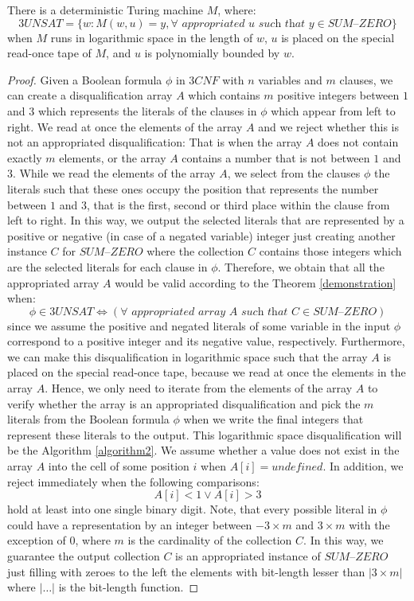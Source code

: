 \documentclass[a4paper,UKenglish,cleveref, autoref]{lipics-v2019}
\begin{document}
\begin{theorem}
\label{demonstration}
There is a deterministic Turing machine $M$, where:
\[3UNSAT = \{w: M(w, u) = y, \forall \textit{ appropriated } u \textit{ such that } y \in \textit{SUM--ZERO}\}\]
when $M$ runs in logarithmic space in the length of $w$, $u$ is placed on the special read-once tape of $M$, and $u$ is polynomially bounded by $w$.
\end{theorem}

\begin{proof}
Given a Boolean formula $\phi$ in $3CNF$ with $n$ variables and $m$ clauses, we can create a disqualification array $A$ which contains $m$ positive integers between $1$ and $3$ which represents the literals of the clauses in $\phi$ which appear from left to right. We read at once the elements of the array $A$ and we reject whether this is not an appropriated disqualification: That is when the array $A$ does not contain exactly $m$ elements, or the array $A$ contains a number that is not between $1$ and $3$. While we read the elements of the array $A$, we select from the clauses $\phi$ the literals such that these ones occupy the position that represents the number between $1$ and $3$, that is the first, second or third place within the clause from left to right. In this way, we output the selected literals that are represented by a positive or negative (in case of a negated variable) integer just creating another instance $C$ for $\textit{SUM--ZERO}$ where the collection $C$ contains those integers which are the selected literals for each clause in $\phi$. Therefore, we obtain that all the appropriated array $A$ would be valid according to the Theorem \ref{demonstration} when:
\[\phi \in 3UNSAT \Leftrightarrow (\forall \textit{ appropriated array } A \textit{ such that } C \in \textit{SUM--ZERO})\]
since we assume the positive and negated literals of some variable in the input $\phi$ correspond to a positive integer and its negative value, respectively. Furthermore, we can make this disqualification in logarithmic space such that the array $A$ is placed on the special read-once tape, because we read at once the elements in the array $A$. Hence, we only need to iterate from the elements of the array $A$ to verify whether the array is an appropriated disqualification and pick the $m$ literals from the Boolean formula $\phi$ when we write the final integers that represent these literals to the output. This logarithmic space disqualification will be the Algorithm \ref{algorithm2}. We assume whether a value does not exist in the array $A$ into the cell of some position $i$ when $A[i] = \textit{undefined}$. In addition, we reject immediately when the following comparisons:
\[A[i] < 1 \vee A[i] > 3\]
hold at least into one single binary digit. Note, that every possible literal in $\phi$ could have a representation by an integer between $-3 \times m$ and $3 \times m$ with the exception of $0$, where $m$ is the cardinality of the collection $C$. In this way, we guarantee the output collection $C$ is an appropriated instance of $\textit{SUM--ZERO}$ just filling with zeroes to the left the elements with bit-length lesser than $|3 \times m|$ where $|\ldots|$ is the bit-length function.


\end{proof}
\end{document}
